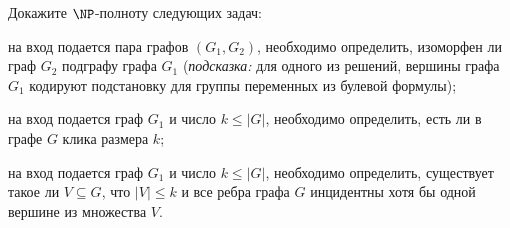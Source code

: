 Докажите $\NP$-полноту следующих задач:
\begin{enumcyr}
    \item на вход подается пара графов $(G_1, G_2)$, необходимо определить, изоморфен ли граф $G_2$
        подграфу графа $G_1$ (\textit{подсказка:} для одного из решений, вершины графа $G_1$ кодируют
        подстановку для группы переменных из булевой формулы);
    \item на вход подается граф $G_1$ и число $k \le |G|$, необходимо определить, есть ли в графе $G$
        клика размера $k$;
    \item на вход подается граф $G_1$ и число $k \le |G|$, необходимо определить, существует такое ли $V
        \subseteq G$, что $|V| \le k$ и все ребра графа $G$ инцидентны хотя бы одной вершине из множества
        $V$.
\end{enumcyr}